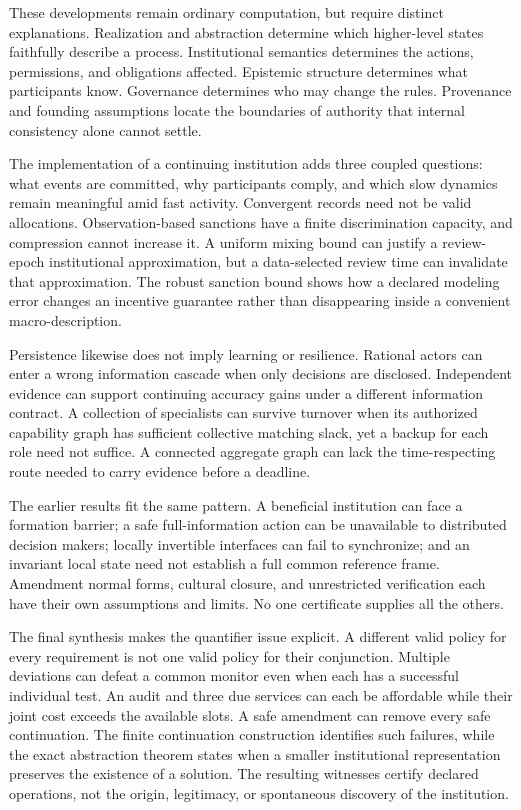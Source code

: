 These developments remain ordinary computation, but require distinct explanations. Realization and abstraction determine which higher-level states faithfully describe a process. Institutional semantics determines the actions, permissions, and obligations affected. Epistemic structure determines what participants know. Governance determines who may change the rules. Provenance and founding assumptions locate the boundaries of authority that internal consistency alone cannot settle.

The implementation of a continuing institution adds three coupled questions: what events are committed, why participants comply, and which slow dynamics remain meaningful amid fast activity. Convergent records need not be valid allocations. Observation-based sanctions have a finite discrimination capacity, and compression cannot increase it. A uniform mixing bound can justify a review-epoch institutional approximation, but a data-selected review time can invalidate that approximation. The robust sanction bound shows how a declared modeling error changes an incentive guarantee rather than disappearing inside a convenient macro-description.

Persistence likewise does not imply learning or resilience. Rational actors can enter a wrong information cascade when only decisions are disclosed. Independent evidence can support continuing accuracy gains under a different information contract. A collection of specialists can survive turnover when its authorized capability graph has sufficient collective matching slack, yet a backup for each role need not suffice. A connected aggregate graph can lack the time-respecting route needed to carry evidence before a deadline.

The earlier results fit the same pattern. A beneficial institution can face a formation barrier; a safe full-information action can be unavailable to distributed decision makers; locally invertible interfaces can fail to synchronize; and an invariant local state need not establish a full common reference frame. Amendment normal forms, cultural closure, and unrestricted verification each have their own assumptions and limits. No one certificate supplies all the others.

The final synthesis makes the quantifier issue explicit. A different valid policy for every requirement is not one valid policy for their conjunction. Multiple deviations can defeat a common monitor even when each has a successful individual test. An audit and three due services can each be affordable while their joint cost exceeds the available slots. A safe amendment can remove every safe continuation. The finite continuation construction identifies such failures, while the exact abstraction theorem states when a smaller institutional representation preserves the existence of a solution. The resulting witnesses certify declared operations, not the origin, legitimacy, or spontaneous discovery of the institution.

